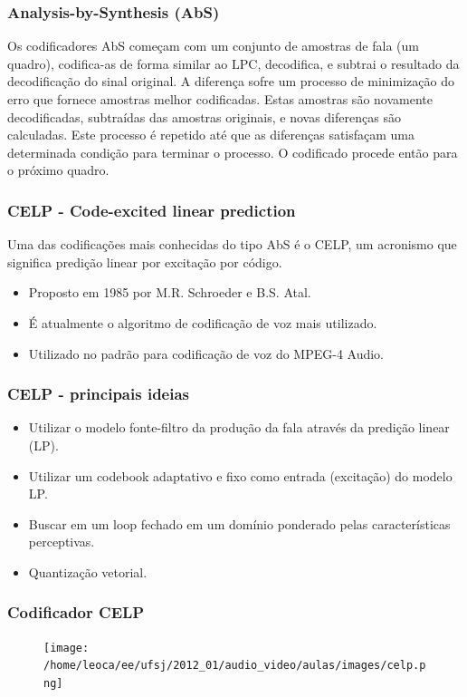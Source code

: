 \begin{frame}
  \frametitle{Analysis-by-Synthesis (AbS)}
  Os codificadores AbS começam com um conjunto de amostras de fala (um quadro),
  codifica-as de forma similar ao LPC, decodifica, e subtrai o resultado da decodificação
  do sinal original. A diferença sofre um processo de minimização do erro que fornece
  amostras melhor codificadas. Estas amostras são novamente decodificadas, subtraídas das amostras
  originais, e novas diferenças são calculadas. Este processo é repetido até que as diferenças
  satisfaçam uma determinada condição para terminar o processo. O codificado procede então para
  o próximo quadro.
\end{frame}



\begin{frame}
  \frametitle{CELP - Code-excited linear prediction}
  Uma das codificações mais conhecidas do tipo AbS é o CELP, um acronismo que significa
  predição linear por excitação por código.
  \begin{itemize}
  \item Proposto em 1985 por M.R. Schroeder e B.S. Atal.
  \item É atualmente o algoritmo de codificação de voz mais utilizado.
  \item Utilizado no padrão para codificação de voz do MPEG-4 Audio.
  \end{itemize}
\end{frame}


\begin{frame}
  \frametitle{CELP - principais ideias}
  \begin{itemize}
  \item Utilizar o modelo fonte-filtro da produção da fala através da predição linear (LP).
  \item Utilizar um codebook adaptativo e fixo como entrada (excitação) do modelo LP.
  \item Buscar em um loop fechado em um domínio ponderado pelas características perceptivas.
  \item Quantização vetorial.
  \end{itemize}
\end{frame}


\begin{frame}
  \frametitle{Codificador CELP}
  \begin{figure}[h]
  \centering 
  \texttt{[image: /home/leoca/ee/ufsj/2012\_01/audio\_video/aulas/images/celp.png]}
  \label{fig:celp}
  \end{figure}
\end{frame}


